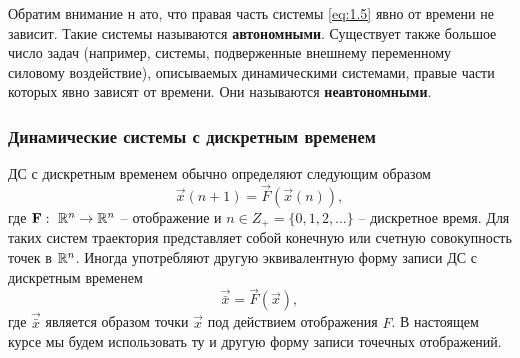 Обратим внимание н ато, что правая часть системы \eqref{eq:1.5} явно от времени не зависит. Такие системы называются \textbf{автономными}. Существует также большое число задач (например, системы, подверженные внешнему переменному силовому воздействие), описываемых динамическими системами, правые части которых явно зависят от времени. Они называются \textbf{неавтономными}.


\subsubsection{Динамические системы с дискретным временем} %
ДС с дискретным временем обычно определяют следующим образом
\begin{equation}
	\label{eq:1.6}
	\vec x(n+1)= \vec F (\vec x(n)),
\end{equation}
где $\mathbf F: ~ \mathbb{R}^n \rightarrow \mathbb{R}^n$ -- отображение и $n \in Z_+ = \{0,1,2, \dots\}$ -- дискретное время. Для таких систем траектория представляет собой конечную или счетную совокупность точек в $\mathbb{R}^n$. Иногда употребляют другую эквивалентную форму записи ДС с дискретным временем
\begin{equation}
	\vec {\bar {x}} = \vec F (\vec x),
\end{equation}
где $\vec{\bar x}$ является образом точки $\vec x$ под действием отображения $F$. В настоящем курсе мы будем использовать ту и другую форму записи точечных отображений.

